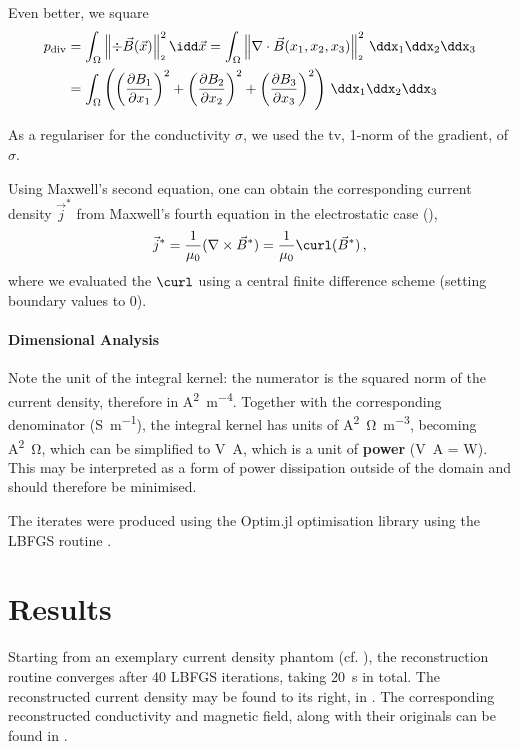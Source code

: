 \documentclass[10pt]{article}
\renewcommand{\norm}[1]{\left\lVert#1\right\rVert_{\scriptscriptstyle 2}}
\begin{document}
  Even better, we square
  \begin{align*}
    p_{\rm div} & = \int_\Omega \norm{\div \vec{B}(\vec{x})}^2 \idd\vec{x} = \int_{\Omega} \norm{\nabla \cdot \vec{B}(x_1, x_2, x_3)}^2 \,\ddx_1\ddx_2\ddx_3                                                             \\
                & = \int_\Omega \left(\left(\frac{\partial B_1}{\partial x_1}\right)^2 + \left(\frac{\partial B_2}{\partial x_2}\right)^2 + \left(\frac{\partial B_3}{\partial x_3}\right)^2\right) \,\ddx_1\ddx_2\ddx_3
  \end{align*}

  As a regulariser for the conductivity $\sigma$, we used the \gls{tv}, 1-norm of the gradient, of $\sigma$.

  Using Maxwell's second equation, one can obtain the corresponding current density $\vec{j}^*$ from Maxwell's fourth equation in the electrostatic case (),
  $$\vec{j}^* = \frac{1}{\mu_0} (\nabla \times \vec{B}^*) = \frac{1}{\mu_0} \curl(\vec{B}^*)\,,$$
  where we evaluated the $\curl$ using a central finite difference scheme (setting boundary values to 0).

  \paragraph{Dimensional Analysis}
  Note the unit of the integral kernel: the numerator is the squared norm of the current density, therefore in \unit{\ampere\squared\per\meter^4}. Together with the corresponding denominator (\unit{\siemens\per\meter}), the integral kernel has units of \unit{\ampere\squared\ohm\per\meter^3}, becoming \unit{\ampere\squared\ohm}, which can be simplified to \unit{\volt\ampere}, which is a unit of \textbf{power} (\unit{\volt\ampere} = \unit{W}).
  This may be interpreted as a form of power dissipation outside of the domain and should therefore be minimised.

  The iterates were produced using the Optim.jl optimisation library \parencite{2018-optim-jl} using the LBFGS routine \parencite{1989-lbfgs}.

  \section{Results}
  \label{sec:results}
  Starting from an exemplary current density phantom (cf. ), the reconstruction routine converges after 40 LBFGS iterations, taking \SI{20}{\second} in total.
  The reconstructed current density may be found to its right, in .
  The corresponding reconstructed conductivity and magnetic field, along with their originals can be found in .
\end{document}
